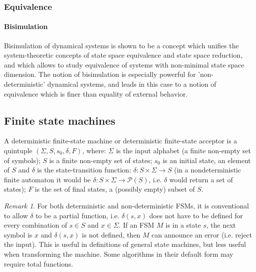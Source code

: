 \documentclass{scrartcl}
\theoremstyle{definition}
\theoremstyle{remark}
\newtheorem{remark}{Remark}
\begin{document}
\subsubsection{Equivalence}
\paragraph{Bisimulation}
Bisimulation of dynamical systems is shown to be a concept which unifies the system-theoretic concepts of state space equivalence and state space reduction, and which allows to study equivalence of systems with non-minimal state space dimension. 
The notion of bisimulation is especially powerful for ’non-deterministic’ dynamical systems, and leads in this case to a notion of equivalence which is finer than equality of external behavior.

\citep{vanderschaft2004bisimulation}

\citep{vanderschaft2004equivalence}

\subsection{Finite state machines}

A deterministic finite-state machine or deterministic finite-state acceptor is a quintuple $(\Sigma ,S,s_{0},\delta,F)$, where: $\Sigma$  is the input alphabet (a finite non-empty set of symbols); $S$ is a finite non-empty set of states; $s_{0}$ is an initial state, an element of $S$ and $\delta$  is the state-transition function: 
$\delta :S\times \Sigma \rightarrow S$ (in a nondeterministic finite automaton it would be $\delta :S\times \Sigma \rightarrow {\mathcal {P}}(S)$, i.e. $\delta$  would return a set of states); $F$ is the set of final states, a (possibly empty) subset of $S$.


\begin{remark}
For both deterministic and non-deterministic FSMs, it is conventional to allow  $\delta$  to be a partial function, i.e. $\delta (s,x)$ does not have to be defined for every combination of $s\in S$ and $x\in \Sigma$. If an FSM $M$ is in a state $s$, the next symbol is $x$ and $\delta (s,x)$ is not defined, then $M$ can announce an error (i.e. reject the input). This is useful in definitions of general state machines, but less useful when transforming the machine. Some algorithms in their default form may require total functions.
\end{remark}
\end{document}
